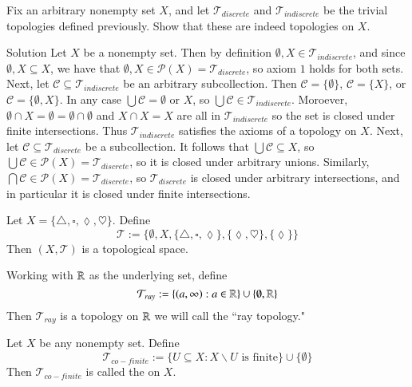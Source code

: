 \documentclass[12pt, a4paper, twoside, openright, titlepage]{book}
\begin{document}
\begin{xca*}{}{}
    Fix an arbitrary nonempty set $X$, and let $\mathcal{T}_{discrete}$ and $\mathcal{T}_{indiscrete}$ be the trivial topologies defined previously. Show that these are indeed topologies on $X$.
\end{xca*}
\begin{cust*}[separator sign={}]{Solution}{}
    Let $X$ be a nonempty set. Then by definition $\emptyset, X \in \mathcal{T}_{indiscrete}$, and since $\emptyset,X \subseteq X$, we have that $\emptyset, X \in \mathcal{P}(X) = \mathcal{T}_{discrete}$, so axiom $1$ holds for both sets. Next, let $\mathcal{C} \subseteq \mathcal{T}_{indiscrete}$ be an arbitrary subcollection. Then $\mathcal{C} = \{\emptyset\}$, $\mathcal{C} = \{X\}$, or $\mathcal{C} = \{\emptyset, X\}$. In any case $\bigcup\mathcal{C} = \emptyset$ or $X$, so $\bigcup\mathcal{C} \in \mathcal{T}_{indiscrete}$. Moroever, $\emptyset\cap X = \emptyset = \emptyset \cap \emptyset$ and $X\cap X = X$ are all in $\mathcal{T}_{indiscrete}$ so the set is closed under finite intersections. Thus $\mathcal{T}_{indiscrete}$ satisfies the axioms of a topology on $X$. Next, let $\mathcal{C} \subseteq \mathcal{T}_{discrete}$ be a subcollection. It follows that $\bigcup\mathcal{C} \subseteq X$, so $\bigcup\mathcal{C} \in \mathcal{P}(X) = \mathcal{T}_{discrete}$, so it is closed under arbitrary unions. Similarly, $\bigcap\mathcal{C} \in \mathcal{P}(X) = \mathcal{T}_{discrete}$, so $\mathcal{T}_{discrete}$ is closed under arbitrary intersections, and in particular it is closed under finite intersections.
\end{cust*}

\begin{eg}{}{}
    Let $X = \{\triangle, \square, \lozenge,\heartsuit\}$. Define $$\mathcal{T}:=\{\emptyset, X, \{\triangle, \square, \lozenge\}, \{\lozenge,\heartsuit\},\{\lozenge\}\}$$
    Then $(X,\mathcal{T})$ is a topological space.
\end{eg}

\begin{eg}{}{}
    Working with $\mathbb R$ as the underlying set, define \begin{equation*}
        \mathcal{T}_{ray} :=\{(a,\infty):a\in \mathbb R\}\cup\{\emptyset,\mathbb R\}
    \end{equation*}
    Then $\mathcal{T}_{ray}$ is a topology on $\mathbb R$ we will call the ``ray topology."
\end{eg}

\begin{eg}{}{}
    Let $X$ be any nonempty set. Define \begin{equation*}
        \mathcal{T}_{co-finite} := \{U \subseteq X:X\backslash U\text{ is finite}\}\cup\{\emptyset\}
    \end{equation*}
    Then $\mathcal{T}_{co-finite}$ is called the  on $X$.
\end{eg}
\end{document}

